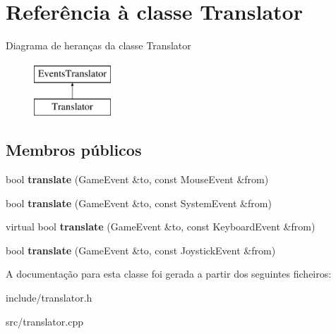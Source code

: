 \hypertarget{classTranslator}{}\section{Referência à classe Translator}
\label{classTranslator}
Diagrama de heranças da classe Translator\begin{figure}[H]
\begin{center}
\leavevmode
\includegraphics[height=2.000000cm]{classTranslator}
\end{center}
\end{figure}
\subsection*{Membros públicos}
\begin{DoxyCompactItemize}
\item 
\mbox{\label{classTranslator_a223b870ca69e0b75b721b266a5aecd2a}} 
bool {\bfseries translate} (Game\+Event \&to, const Mouse\+Event \&from)
\item 
\mbox{\label{classTranslator_ad1910814cca5d0f3d9dbffa4721071ea}} 
bool {\bfseries translate} (Game\+Event \&to, const System\+Event \&from)
\item 
\mbox{\label{classTranslator_a23fe703107ba6e3b26e5da8e9f28777a}} 
virtual bool {\bfseries translate} (Game\+Event \&to, const Keyboard\+Event \&from)
\item 
\mbox{\label{classTranslator_ad75df11a67688dba45a23cecc9930970}} 
bool {\bfseries translate} (Game\+Event \&to, const Joystick\+Event \&from)
\end{DoxyCompactItemize}


A documentação para esta classe foi gerada a partir dos seguintes ficheiros\+:\begin{DoxyCompactItemize}
\item 
include/translator.\+h\item 
src/translator.\+cpp\end{DoxyCompactItemize}
